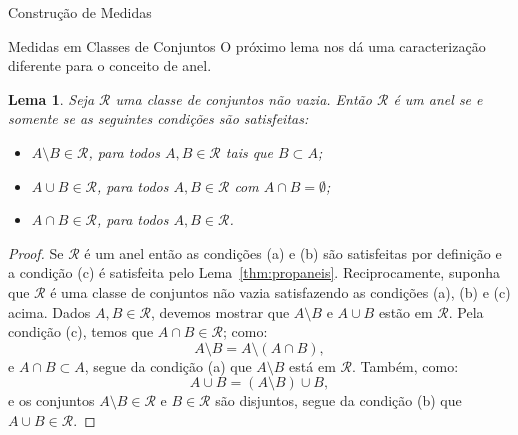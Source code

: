 \documentclass[oneside,final,11pt]{amsbook}
\theoremstyle{remark}\newtheorem{exercise}{Exercício}[chapter]
\theoremstyle{remark}\newtheorem{*exercise}[exercise]{\hbox to 0pt{\hskip 0pt minus 1fil*}Exercício}
\theoremstyle{definition}\newtheorem{exdefin}{Definição}[chapter]
\theoremstyle{plain}\newtheorem{teo}{Teorema}[section]
\theoremstyle{plain}\newtheorem{lem}[teo]{Lema}
\theoremstyle{plain}\newtheorem{prop}[teo]{Proposição}
\theoremstyle{plain}\newtheorem{cor}[teo]{Corolário}
\theoremstyle{definition}\newtheorem{defin}[teo]{Definição}
\theoremstyle{remark}\newtheorem{rem}[teo]{Observação}
\theoremstyle{definition}\newtheorem{notation}[teo]{Notação}
\theoremstyle{definition}\newtheorem{convention}[teo]{Convenção}
\theoremstyle{definition}\newtheorem{example}[teo]{Exemplo}
\numberwithin{section}{chapter}
\numberwithin{equation}{section}
\begin{document}
\begin{chapter}{Construção de Medidas}
\begin{section}{Medidas em Classes de Conjuntos}
O próximo lema nos dá uma caracterização diferente para o conceito de anel.
\begin{lem}\label{thm:outradefanel}
Seja $\mathcal R$ uma classe de conjuntos não vazia. Então $\mathcal R$ é um anel se e somente se as seguintes condições
são satisfeitas:
\begin{itemize}
\item[(a)] $A\setminus B\in\mathcal R$, para todos $A,B\in\mathcal R$ tais que $B\subset A$;
\item[(b)] $A\cup B\in\mathcal R$, para todos $A,B\in\mathcal R$ com $A\cap B=\emptyset$;
\item[(c)] $A\cap B\in\mathcal R$, para todos $A,B\in\mathcal R$.
\end{itemize}
\end{lem}
\begin{proof}
Se $\mathcal R$ é um anel então as condições (a) e (b) são satisfeitas por definição e a condição (c) é satisfeita
pelo Lema~\ref{thm:propaneis}. Reciprocamente, suponha que $\mathcal R$ é uma classe de conjuntos não vazia
satisfazendo as condições (a), (b) e (c) acima. Dados $A,B\in\mathcal R$, devemos mostrar que $A\setminus B$
e $A\cup B$ estão em $\mathcal R$. Pela condição (c), temos que $A\cap B\in\mathcal R$; como:
\[A\setminus B=A\setminus(A\cap B),\]
e $A\cap B\subset A$, segue da condição (a) que $A\setminus B$ está em $\mathcal R$. Também, como:
\[A\cup B=(A\setminus B)\cup B,\]
e os conjuntos $A\setminus B\in\mathcal R$ e $B\in\mathcal R$ são disjuntos, segue da condição (b) que
$A\cup B\in\mathcal R$.
\end{proof}


\end{section}
\end{chapter}
\end{document}
